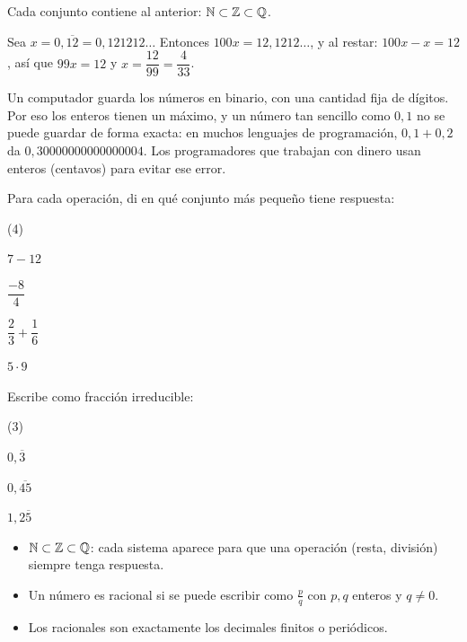 \documentclass[11pt]{article}
\begin{document}
Cada conjunto contiene al anterior: $\mathbb{N} \subset \mathbb{Z} \subset \mathbb{Q}$.

\begin{ejemplo}
Sea $x = 0{,}\overline{12} = 0{,}121212\ldots$ Entonces $100x = 12{,}1212\ldots$, y
al restar: $100x - x = 12$, así que $99x = 12$ y
$x = \dfrac{12}{99} = \dfrac{4}{33}$.
\end{ejemplo}

\begin{aplicacion}
Un computador guarda los números en binario, con una cantidad fija de dígitos.
Por eso los enteros tienen un máximo, y un número tan sencillo como $0{,}1$ no se
puede guardar de forma exacta: en muchos lenguajes de programación, $0{,}1 + 0{,}2$
da $0{,}30000000000000004$. Los programadores que trabajan con dinero usan
enteros (centavos) para evitar ese error.
\end{aplicacion}

\begin{preguntas}
\pregunta Para cada operación, di en qué conjunto más pequeño tiene respuesta:
\begin{opciones*}(4)
  \item $7 - 12$
  \item $\dfrac{-8}{4}$
  \item $\dfrac{2}{3} + \dfrac{1}{6}$
  \item $5 \cdot 9$
\end{opciones*}
\espacio{2.5cm}
\pregunta Escribe como fracción irreducible:
\begin{opciones*}(3)
  \item $0{,}\overline{3}$
  \item $0{,}\overline{45}$
  \item $1{,}2\overline{5}$
\end{opciones*}
\espacio{3cm}
\end{preguntas}

\begin{resumen}
\begin{itemize}
  \item $\mathbb{N} \subset \mathbb{Z} \subset \mathbb{Q}$: cada sistema aparece para que una operación
        (resta, división) siempre tenga respuesta.
  \item Un número es racional si se puede escribir como $\frac{p}{q}$ con
        $p, q$ enteros y $q \neq 0$.
  \item Los racionales son exactamente los decimales finitos o periódicos.
\end{itemize}
\end{resumen}
\end{document}
